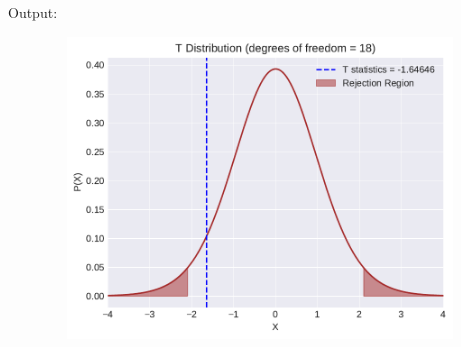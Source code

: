 \documentclass[a4paper,11pt,openright]{report}
\begin{document}
\begin{enumerate}
\vspace{1cm}

Output:


\begin{figure}[ht!]
\includegraphics[width=16cm,height=8cm,keepaspectratio]{ttest2.pdf}
\centering
\end{figure}

\end{enumerate}
\end{document}

